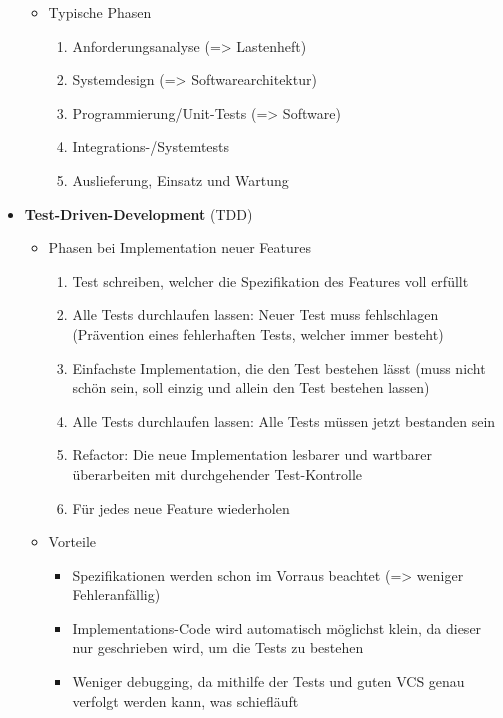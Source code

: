 \documentclass[a4paper, 11pt]{article}
\begin{document}
\begin{itemize}
\begin{itemize}
\begin{itemize}
		            \end{itemize}
		      \item Typische Phasen
		            \begin{enumerate}
			            \item Anforderungsanalyse (=> Lastenheft)
			            \item Systemdesign (=> Softwarearchitektur)
			            \item Programmierung/Unit-Tests (=> Software)
			            \item Integrations-/Systemtests
			            \item Auslieferung, Einsatz und Wartung
		            \end{enumerate}
	      \end{itemize}
	\item \textbf{Test-Driven-Development} (TDD)
	      \begin{itemize}
		      \item Phasen bei Implementation neuer Features
		            \begin{enumerate}
			            \item Test schreiben, welcher die Spezifikation des Features voll erfüllt
			            \item Alle Tests durchlaufen lassen: Neuer Test muss fehlschlagen (Prävention eines fehlerhaften Tests, welcher immer besteht)
			            \item Einfachste Implementation, die den Test bestehen lässt (muss nicht schön sein, soll einzig und allein den Test bestehen lassen)
			            \item Alle Tests durchlaufen lassen: Alle Tests müssen jetzt bestanden sein
			            \item Refactor: Die neue Implementation lesbarer und wartbarer überarbeiten mit durchgehender Test-Kontrolle
			            \item Für jedes neue Feature wiederholen
		            \end{enumerate}
		      \item Vorteile
		            \begin{itemize}
			            \item Spezifikationen werden schon im Vorraus beachtet (=> weniger Fehleranfällig)
			            \item Implementations-Code wird automatisch möglichst klein, da dieser nur geschrieben wird, um die Tests zu bestehen
			            \item Weniger debugging, da mithilfe der Tests und guten VCS genau verfolgt werden kann, was schiefläuft

\end{itemize}
\end{itemize}
\end{itemize}
\end{document}
